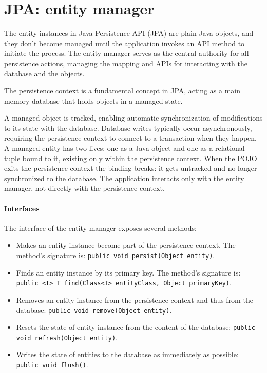 \section{JPA: entity manager}

The entity instances in Java Persistence API (JPA) are plain Java objects, and they don't become managed until the application invokes an API method to initiate the process. 
The entity manager serves as the central authority for all persistence actions, managing the mapping and APIs for interacting with the database and the objects.
\begin{definition}
    The persistence context is a fundamental concept in JPA, acting as a main memory database that holds objects in a managed state.
\end{definition}
A managed object is tracked, enabling automatic synchronization of modifications to its state with the database.
Database writes typically occur asynchronously, requiring the persistence context to connect to a transaction when they happen. 
A managed entity has two lives: one as a Java object and one as a relational tuple bound to it, existing only within the persistence context.
When the POJO exits the persistence context the binding breaks: it gets untracked and no longer synchronized to the database.
The application interacts only with the entity manager, not directly with the persistence context.

\paragraph*{Interfaces}
The interface of the entity manager exposes several methods:
\begin{itemize}
    \item Makes an entity instance become part of the persistence context. 
        The method's signature is: \texttt{public void persist(Object entity)}. 
    \item Finds an entity instance by its primary key. 
        The method's signature is: \texttt{public <T> T find(Class<T> entityClass, Object primaryKey)}.
    \item Removes an entity instance from the persistence context and thus from the database: \texttt{public void remove(Object entity)}.
    \item Resets the state of entity instance from the content of the database: \texttt{public void refresh(Object entity)}.
    \item Writes the state of entities to the database as immediately as possible: \texttt{public void flush()}.
\end{itemize}

